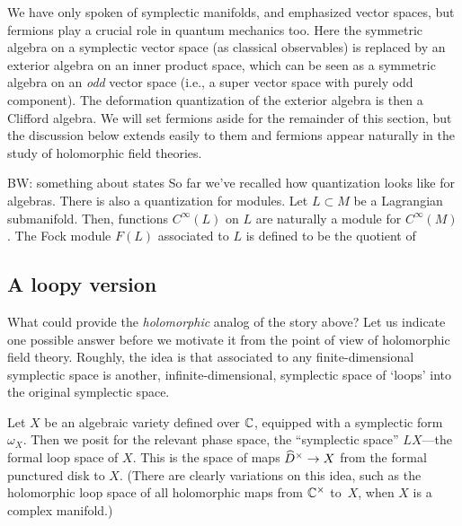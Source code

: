 \documentclass[11pt]{amsart}
\def\brian#1{{\textcolor{blue!75!red}{BW: {#1}}}}
\def\owen#1{{\textcolor{violet!50!black}{OG: {#1}}}}
\begin{document}
\begin{rmk}
We have only spoken of symplectic manifolds, and emphasized vector spaces,
but fermions play a crucial role in quantum mechanics too.
Here the symmetric algebra on a symplectic vector space (as classical observables) 
is replaced by an exterior algebra on an inner product space,
which can be seen as a symmetric algebra on an {\em odd} vector space
(i.e., a super vector space with purely odd component).
The deformation quantization of the exterior algebra is then a Clifford algebra.
We will set fermions aside for the remainder of this section,
but the discussion below extends easily to them and fermions appear naturally in the study of holomorphic field theories.
\end{rmk}

\brian{something about states}
So far we've recalled how quantization looks like for algebras.
There is also a quantization for modules.
Let $L \subset M$ be a Lagrangian submanifold.
Then, functions $C^\infty(L)$ on $L$ are naturally a module for $C^\infty(M)$.
The Fock module $F(L)$ associated to $L$ is defined to be the quotient of 

\subsection{A loopy version}

What could provide the {\em holomorphic} analog of the story above?
Let us indicate one possible answer before we motivate it from the point of view of holomorphic field theory.
Roughly, the idea is that associated to any finite-dimensional symplectic space is another, infinite-dimensional, symplectic space of `loops' into the original symplectic space.


Let $X$ be an algebraic variety defined over $\CC$, equipped with a symplectic form $\omega_X$.
Then we posit for the relevant phase space, the ``symplectic space'' $LX$---the formal loop space of $X$.
This is the space of maps $\Hat{D}^\times \to X$ from the formal punctured disk to $X$.
%
(There are clearly variations on this idea, such as the holomorphic loop space of all holomorphic maps from $\CC^\times$ to~$X$, when $X$ is a complex manifold.)
\end{document}
